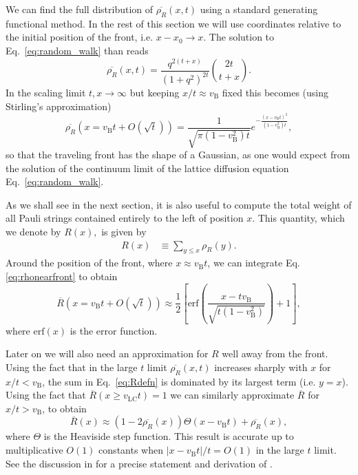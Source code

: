 \documentclass[aps,prb,twocolumn,superscriptaddress]{revtex4-1}
\begin{document}
We can find the full distribution of $\overline{\rho_R}(x,t)$ using a standard generating functional method. In the rest of this section we will use coordinates relative to the initial position of the front, i.e. $x-x_0 \to x$. The solution to Eq.~\eqref{eq:random_walk} than reads
\begin{equation}\label{eq:rho_solution}
\overline{\rho_{R}}(x,t) = \frac{q^{2(t+x)}}{(1+q^2)^{2t}} {2t \choose t+x}.
\end{equation}
In the scaling limit $t,x\to\infty$ but keeping $x/t \approx v_{\text{B}}$ fixed this becomes (using Stirling's approximation)
\begin{equation}
\overline{\rho_{R}}(x=v_{\text{B}}t+O(\sqrt{t}))=\frac{1}{\sqrt{\pi(1-v_{\text{B}}^{2})t}}e^{-\frac{(x-v_{\text{B}}t)^{2}}{(1-v_{\text{B}}^{2})t}}\label{eq:rhonearfront},
\end{equation}
so that the traveling front has the shape of a Gaussian, as one would expect from the solution of the continuum limit of the lattice diffusion equation Eq.~\eqref{eq:random_walk}.

As we shall see in the next section, it is also useful to compute the total weight of all Pauli strings contained entirely to the left of position $x$. This quantity, which we denote by $R(x),$ is given by
\begin{align}
R(x) & \equiv\sum_{y\leq x}\rho_{R}(y).
\label{eq:Rdefn}
\end{align}
Around the position of the front, where $x\approx v_{\text{B}}t$, we can integrate Eq. \eqref{eq:rhonearfront}
to obtain 
\begin{equation}
\overline{R}(x=v_{\text{B}}t+O(\sqrt{t}))\approx\frac{1}{2}\left[\text{erf}(\frac{x-t v_{\text{B}}}{\sqrt{t(1-v_{\text{B}}^{2})}})+1\right],\label{eq:frontRscaling}
\end{equation}
where $\text{erf}(x)$ is the error function.

Later on we will also need an approximation for $R$ well away from the front. Using
the fact that in the large $t$ limit $\overline{\rho_{R}}(x,t)$ increases sharply with $x$ for $x/t<v_{\text{B}}$, the sum in Eq.~\eqref{eq:Rdefn} is dominated by its largest term
(i.e. $y=x$). Using the fact that $\overline{R}\left(x\geq v_\text{LC} t \right)=1$ we can similarly approximate $\overline{R}$ for $x/t>v_{\text{B}}$, to obtain
\begin{equation}\label{eq:Rapprox}
\overline{R}(x)\approx(1-2\overline{\rho_{R}}(x))\Theta(x-v_{\text{B}}t)+\overline{\rho_{R}}(x),
\end{equation}
where $\Theta$ is the Heaviside step function. This result is accurate up to multiplicative $O(1)$ constants when $|x-v_{\text{B}}t|/t = O(1)$ in the large $t$ limit. See the discussion in  for a precise statement and derivation of . 
\end{document}
